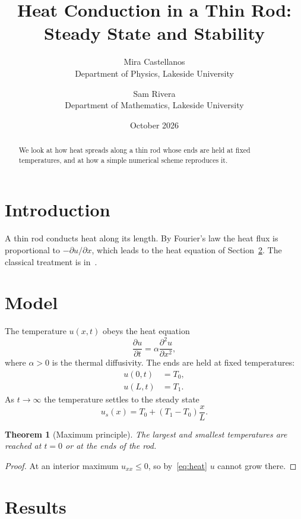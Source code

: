 \documentclass[11pt,a4paper]{article}
\title{Heat Conduction in a Thin Rod: Steady State and Stability}
\author{Mira Castellanos\\ \small Department of Physics, Lakeside University \and Sam Rivera\\ \small Department of Mathematics, Lakeside University}
\date{October 2026}
\newtheorem{theorem}{Theorem}
\begin{document}
\maketitle

\begin{abstract}
We look at how heat spreads along a thin rod whose ends are held at fixed temperatures, and at how a simple numerical scheme reproduces it.
\end{abstract}

\section{Introduction}\label{sec:intro}

A thin rod conducts heat along its length. By Fourier's law the heat flux is proportional to $-\partial u/\partial x$, which leads to the heat equation of Section~\ref{sec:model}. The classical treatment is in~\cite{carslaw1959}.

\section{Model}\label{sec:model}

The temperature $u(x,t)$ obeys the heat equation
\begin{equation}
  \frac{\partial u}{\partial t}=\alpha\frac{\partial^{2}u}{\partial x^{2}},
  \label{eq:heat}
\end{equation}
where $\alpha>0$ is the thermal diffusivity. The ends are held at fixed temperatures:
\begin{align}
  u(0,t) &=T_{0}, \label{eq:bc0} \\
  u(L,t) &=T_{1}. \label{eq:bc1}
\end{align}
As $t\to\infty$ the temperature settles to the steady state
\begin{equation}
  u_{s}(x)=T_{0}+(T_{1}-T_{0})\frac{x}{L}.
  \label{eq:4}
\end{equation}

\begin{theorem}[{Maximum principle}]\label{thm:max}
  The largest and smallest temperatures are reached at $t=0$ or at the ends of the rod.
\end{theorem}

\begin{proof}
  At an interior maximum $u_{xx}\leq0$, so by~\eqref{eq:heat} $u$ cannot grow there.
\end{proof}

\section{Results}\label{sec:results}
\end{document}
